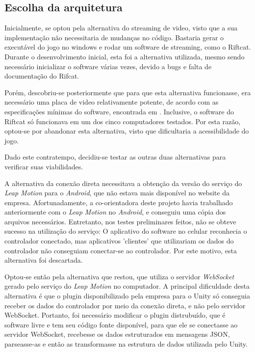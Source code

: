 
\subsection{Escolha da arquitetura}\label{subsec-arquitetura-escolha}

Inicialmente, se optou pela alternativa do streaming de video, visto que a sua implementação não necessitaria de mudanças no código. Bastaria gerar o executável do jogo no windows e rodar um software de streaming, como o Riftcat. Durante o desenvolvimento inicial, esta foi a alternativa utilizada, mesmo sendo necessário inicializar o software várias vezes, devido a bugs e falta de documentação do Rifcat.

Porém, descobriu-se posteriormente que para que esta alternativa funcionasse, era necessário uma placa de video relativamente potente, de acordo com as especificações mínimas do software, encontrada em \cite{riftcat:2016:requirements}. Inclusive, o software do Riftcat só funcionava em um dos cinco computadores testados. Por esta razão, optou-se por abandonar esta alternativa, visto que dificultaria a acessibilidade do jogo.

Dado este contratempo, decidiu-se testar as outras duas alternativas para verificar suas viabilidades. 

A alternativa da conexão direta necessitava a obtenção da versão do serviço do \textit{Leap Motion} para o \textit{Android}, que não estava mais disponível no website da empresa. Afortunadamente, a co-orientadora deste projeto havia trabalhado anteriormente com o \textit{Leap Motion} no \textit{Android}, e conseguiu uma cópia dos arquivos necessários. Entretanto, nos testes preliminares feitos, não se obteve sucesso na utilização do serviço: O aplicativo do software no celular reconhecia o controlador conectado, mas aplicativos 'clientes' que utilizariam os dados do controlador não conseguiam conectar-se ao controlador. Por este motivo, esta alternativa foi descartada.

Optou-se então pela alternativa que restou, que utiliza o servidor \textit{WebSocket} gerado pelo serviço do \textit{Leap Motion} no computador. A principal dificuldade desta alternativa é que o plugin disponibilizado pela empresa para o Unity só conseguia receber os dados do controlador por meio da conexão direta, e não pelo servidor WebSocket. Portanto, foi necessário modificar o plugin distrubuído, que é software livre e tem seu código fonte disponível, para que ele se conectasse ao servidor WebSocket, recebesse os dados estruturados em mensagens JSON, parseasse-as e então as transformasse na estrutura de dados utilizada pelo Unity.

